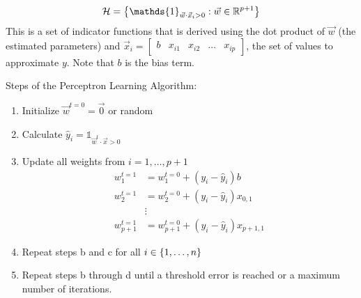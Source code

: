 \documentclass[12pt]{article}
\newcommand{\indicator}[1]{\mathds{1}_{#1}}
\begin{document}
\begin{enumerate} 

$$ \mathcal{H} = \set{ \indicator{\vec{w} \cdot \vec{x}_i > 0} : \vec{w} \in \mathbb{R}^{p+1}} $$ This is a set of indicator functions that is derived using the dot product of $\vec{w}$ (the estimated parameters) and $\vec{x}_i = \begin{bmatrix} b & x_{i1} & x_{i2} & \dots & x_{ip} \end{bmatrix}$, the set of values to approximate $y$. Note that $b$ is the bias term. 

Steps of the Perceptron Learning Algorithm: \begin{enumerate}
\item Initialize $\vec{w}^{t = 0} = \vec{0}$ or random
\item Calculate $\hat{y}_i = \indicator{\vec{w}^t \cdot \vec{x} > 0}$
\item Update all weights from $i = 1,\dots,p+1$
$$ \begin{aligned} 
w_1^{t=1} &= w_1^{t = 0} + (y_i - \hat{y}_i)b \\
w_2^{t=1} &= w_2^{t = 0} + (y_i - \hat{y}_i)x_{0,1} \\ 
&\vdots \\ 
w_{p+1}^{t = 1} &= w_{p+1}^{t = 0} + (y_i - \hat{y}_i)x_{p+1,1} \end{aligned} $$ 
\item Repeat steps b and c for all $i \in \left\{1,\dots,n\right\}$
\item Repeat steps b through d until a threshold error is reached or a maximum number of iterations. \end{enumerate} 

 \newpage


\end{enumerate}
\end{document}
